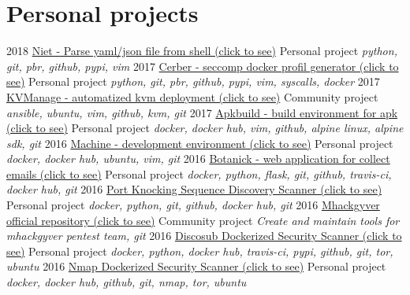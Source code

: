\documentclass[]{friggeri-cv}
\begin{document}
\newpage

\section{Personal projects}
\begin{entrylist}
    \entry
        {2018}
        {\href{https://github.com/gr0und-s3ct0r/niet}{Niet - Parse yaml/json file from shell (click to see)}}
        {Personal project}
        {\emph{python, git, pbr, github, pypi, vim}}
    \entry
        {2017}
        {\href{https://github.com/gr0und-s3ct0r/cerber}{Cerber - seccomp docker profil generator (click to see)}}
        {Personal project}
        {\emph{python, git, pbr, github, pypi, vim, syscalls, docker}}
    \entry
        {2017}
        {\href{https://github.com/sweet-sinatra/kvmanage/}{KVManage - automatized kvm deployment (click to see)}}
        {Community project}
        {\emph{ansible, ubuntu, vim, github, kvm, git}}
    \entry
        {2017}
        {\href{https://github.com/gr0und-s3ct0r/apkbuild}{Apkbuild - build environment for apk (click to see)}}
        {Personal project}
        {\emph{docker, docker hub, vim, github, alpine linux, alpine sdk, git}}
    \entry
        {2016}
        {\href{https://github.com/4383/machine}{Machine - development environment (click to see)}}
        {Personal project}
        {\emph{docker, docker hub, ubuntu, vim, git}}
    \entry
        {2016}
        {\href{https://github.com/4383/Botanick}{Botanick - web application for collect emails (click to see)}}
        {Personal project}
        {\emph{docker, python, flask, git, github, travis-ci, docker hub, git}}
    \entry
        {2016}
        {\href{https://github.com/mhackgyver-squad/porno-king}{Port Knocking Sequence Discovery Scanner (click to see)}}
        {Personal project}
        {\emph{docker, python, git, github, docker hub, git}}
    \entry
        {2016}
        {\href{https://github.com/mhackgyver-squad/mhackgyver}{Mhackgyver official repository (click to see)}}
        {Community project}
        {\emph{Create and maintain tools for mhackgyver pentest team, git}}
    \entry
        {2016}
        {\href{https://hub.docker.com/r/4383/discosub}{Discosub Dockerized Security Scanner (click to see)}}
        {Personal project}
        {\emph{docker, python, docker hub, travis-ci, pypi, github, git, tor, ubuntu}}
    \entry
        {2016}
        {\href{https://hub.docker.com/r/4383/system-service-footprint}{Nmap Dockerized Security Scanner (click to see)}}
        {Personal project}
        {\emph{docker, docker hub, github, git, nmap, tor, ubuntu}}

\end{entrylist}
\end{document}
